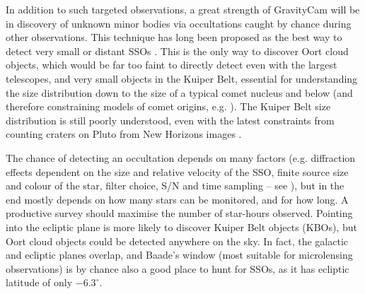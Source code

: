\documentclass{pasa}%
\begin{document}
In addition to such targeted observations, a great strength of GravityCam will be in discovery of unknown minor bodies via occultations caught by chance during other observations. This technique has long been proposed as the best way to detect very small or distant SSOs \citep{Bailey1976,Nihei2007}. This is the only way to discover Oort cloud objects, which would be far too faint to directly detect even with the largest telescopes, and very small objects in the Kuiper Belt, essential for understanding the size distribution down to the size of a typical comet nucleus and below (and therefore constraining models of comet origins, e.g. \citealt{Schlichting2012,Davidsson2016}). The Kuiper Belt size distribution is still poorly understood, even with the latest constraints from counting craters on Pluto from New Horizons images \citep{2015Icar..258..267G}.

The chance of detecting an occultation depends on many factors (e.g. diffraction effects dependent on the size and relative velocity of the SSO, finite source size and colour of the star, filter choice, S/N and time sampling -- see \citealt{Nihei2007}), but in the end mostly depends on how many stars can be monitored, and for how long. 
A productive survey should maximise the number of star-hours observed. Pointing into the ecliptic plane is more likely to discover Kuiper Belt objects (KBOs), but Oort cloud objects could be detected anywhere on the sky.
In fact, the galactic and ecliptic planes overlap, and Baade's window (most suitable for microlensing observations) is by chance also a good place to hunt for SSOs, as it has ecliptic latitude of only $-6.3^\circ$.

\end{document}
